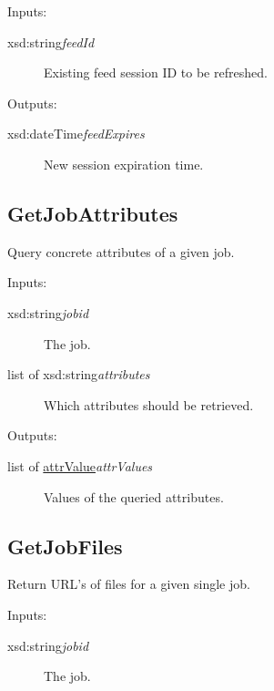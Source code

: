 Inputs: 
\begin{description}
\item[{xsd:string{\ttfamily\itshape{{feedId}}}}]\null{}
Existing feed session ID to be refreshed.
\end{description}
\noindent 

Outputs: 
\begin{description}
\item[{xsd:dateTime{\ttfamily\itshape{{feedExpires}}}}]\null{}
New session expiration time.
\end{description}
\noindent 
\subsection{GetJobAttributes}
\label{op:GetJobAttributes}\hypertarget{op:GetJobAttributes}{}%

Query concrete attributes of a given job.

Inputs: 
\begin{description}
\item[{xsd:string{\ttfamily\itshape{{jobid}}}}]\null{}
The job.
\item[{list of xsd:string{\ttfamily\itshape{{attributes}}}}]\null{}
Which attributes should be retrieved.
\end{description}
\noindent 

Outputs: 
\begin{description}
\item[{list of \hyperlink{type:attrValue}{attrValue}{\ttfamily\itshape{{attrValues}}}}]\null{}
Values of the queried attributes.
\end{description}
\noindent 
\subsection{GetJobFiles}
\label{op:GetJobFiles}\hypertarget{op:GetJobFiles}{}%

Return URL's of files for a given single job.

Inputs: 
\begin{description}
\item[{xsd:string{\ttfamily\itshape{{jobid}}}}]\null{}
The job.
\end{description}
\noindent 

